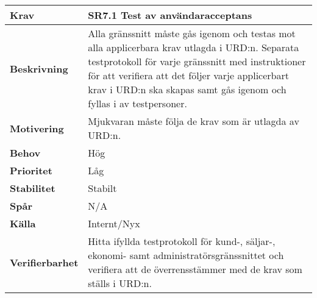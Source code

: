 \documentclass[a4paper, twoside, 11pt, titlepage]{article}
\begin{document}
	\begin{tabular} { p{2.6cm} p{12.5cm} }
		\hline
		\sffamily\textbf{Krav} & \sffamily\textbf{SR7.1 Test av användaracceptans } \\
		\hline
		\sffamily\textbf{Beskrivning} & Alla gränssnitt måste gås igenom och testas mot alla applicerbara krav utlagda i URD:n. Separata testprotokoll för varje gränssnitt med instruktioner för att verifiera att det följer varje applicerbart krav i URD:n ska skapas samt gås igenom och fyllas i av testpersoner.  \\
		\hline
		\sffamily\textbf{Motivering} & Mjukvaran måste följa de krav som är utlagda av URD:n.  \\
		\hline
		\sffamily\textbf{Behov} & Hög  \\
		\hline
		\sffamily\textbf{Prioritet} & Låg  \\
		\hline
		\sffamily\textbf{Stabilitet} & Stabilt  \\
		\hline
		\sffamily\textbf{Spår} & N/A  \\
		\hline
		\sffamily\textbf{Källa} & Internt/Nyx  \\
		\hline
		\sffamily\textbf{Verifierbarhet} & Hitta ifyllda testprotokoll för kund-, säljar-, ekonomi- samt administratörsgränssnittet och verifiera att de överrensstämmer med de krav som ställs i URD:n.  \\
		\hline
	\end{tabular}
	\vspace{6mm}
\end{document}
